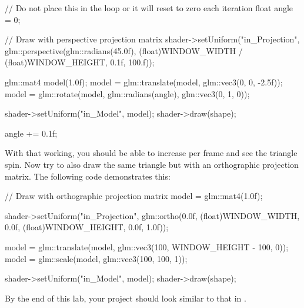 \documentclass[10pt]{article}
\begin{document}
\begin{Code}

// Do not place this in the loop or it will reset to zero each iteration
float angle = 0;

// Draw with perspective projection matrix
shader->setUniform("in_Projection", glm::perspective(glm::radians(45.0f),
 (float)WINDOW_WIDTH / (float)WINDOW_HEIGHT, 0.1f, 100.f));

glm::mat4 model(1.0f);
model = glm::translate(model, glm::vec3(0, 0, -2.5f));
model = glm::rotate(model, glm::radians(angle), glm::vec3(0, 1, 0));

shader->setUniform("in_Model", model);
shader->draw(shape);

angle += 0.1f;

\end{Code}


With that working, you should be able to increase  per frame
and see the triangle spin. Now try to also draw the same triangle but with
an orthographic projection matrix.  The following code demonstrates this:

\begin{Code}

// Draw with orthographic projection matrix
model = glm::mat4(1.0f);

shader->setUniform("in_Projection", glm::ortho(0.0f,
  (float)WINDOW_WIDTH, 0.0f, (float)WINDOW_HEIGHT, 0.0f, 1.0f));

model = glm::translate(model, glm::vec3(100, WINDOW_HEIGHT - 100, 0));
model = glm::scale(model, glm::vec3(100, 100, 1));

shader->setUniform("in_Model", model);
shader->draw(shape);

\end{Code}

By the end of this lab, your project should look similar to that in .

\end{document}
